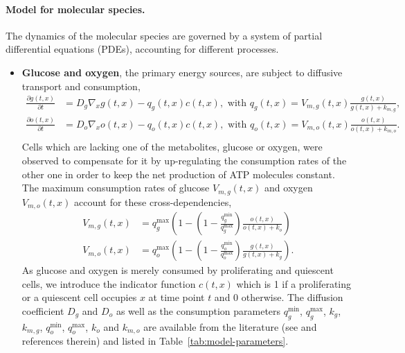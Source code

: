 \documentclass[10pt,letterpaper]{article}
\begin{document}
\paragraph{Model for molecular species.} 
The dynamics of the molecular species are governed by a system of partial differential equations (PDEs), accounting for different processes.
\begin{itemize}
%
\item \textbf{Glucose and oxygen}, the primary energy sources, are subject to diffusive transport and consumption,
\begin{equation*}
\begin{aligned}
	\frac{\partial g(t,x)}{\partial t} &= D_g \nabla_x g(t,x) - q_g(t,x) c(t,x), \text{ with } q_g(t,x) = V_{m,g}(t,x) \frac{g(t,x)}{g(t,x)+k_{m,g}},\\
	\frac{\partial o(t,x)}{\partial t} &= D_o \nabla_x o(t,x) - q_o(t,x) c(t,x), \text{ with } q_o(t,x) = V_{m,o}(t,x) \frac{o(t,x)}{o(t,x)+k_{m,o}}.\\
\end{aligned}
\end{equation*}
Cells which are lacking one of the metabolites, glucose or oxygen, were observed to compensate for it by up-regulating the consumption rates of the other one in order to keep the net production of ATP molecules constant. The maximum consumption rates of glucose $V_{m,g}(t,x)$ and oxygen $V_{m,o}(t,x)$ account for these cross-dependencies,
\begin{equation*}
\begin{aligned}
V_{m,g}(t,x) &= q_g^{\max} \left(1 - \left(1- \frac{q_g^{\min}}{q_g^{\max}} \right) \frac{o(t,x)}{o(t,x) + k_o} \right) \\
V_{m,o}(t,x) &= q_o^{\max} \left(1 - \left(1- \frac{q_o^{\min}}{q_o^{\max}} \right) \frac{g(t,x)}{g(t,x) + k_g} \right).
\end{aligned}
\end{equation*}
As glucose and oxygen is merely consumed by proliferating and quiescent cells, we introduce the indicator function $c(t,x)$ which is 1 if a proliferating or a quiescent cell occupies $x$ at time point $t$ and 0 otherwise. The diffusion coefficient $D_g$ and $D_o$ as well as the consumption parameters $q_g^{\min}$, $q_g^{\max}$, $k_g$, $k_{m,g}$, $q_o^{\min}$, $q_o^{\max}$, $k_o$ and $k_{m,o}$ are available from the literature (see \cite{Jagiella2012} and references therein) and listed in Table~\ref{tab:model-parameters}.


\end{itemize}
\end{document}

